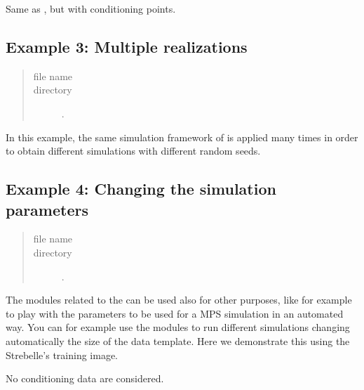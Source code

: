 \documentclass[letterpaper,10pt,english]{sphinxmanual}
\begin{document}
Same as , but with conditioning points.


\subsection{Example 3: Multiple realizations}
\label{\detokenize{examples:example-3-multiple-realizations}}\begin{quote}\begin{description}
\item[{file name}] \leavevmode
{}

\item[{directory}] \leavevmode
{}.

\end{description}\end{quote}

In this example, the same simulation framework of  is applied
many times in order to obtain different simulations with different
random seeds.


\subsection{Example 4: Changing the simulation parameters}
\label{\detokenize{examples:example-4-changing-the-simulation-parameters}}\begin{quote}\begin{description}
\item[{file name}] \leavevmode
{}

\item[{directory}] \leavevmode
{}.

\end{description}\end{quote}

The modules related to the  can be used also for other
purposes, like for example to play with the parameters to be used
for a MPS simulation in an automated way.
You can for example use the modules to run different simulations
changing automatically the size of the data template.
Here we demonstrate this using the Strebelle’s training image.

No conditioning data are considered.
\end{document}
